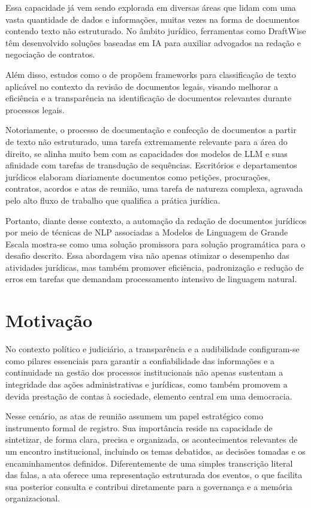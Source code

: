 Essa capacidade já vem sendo explorada em diversas áreas que lidam com uma vasta quantidade de dados e informações, muitas vezes na forma de documentos contendo texto não estruturado. No âmbito jurídico, ferramentas como DraftWise têm desenvolvido soluções baseadas em IA para auxiliar advogados na redação e negociação de contratos.

Além disso, estudos como o de  propõem frameworks para classificação de texto aplicável no contexto da revisão de documentos legais, visando melhorar a eficiência e a transparência na identificação de documentos relevantes durante processos legais.   

Notoriamente, o processo de documentação e confecção de documentos a partir de texto não estruturado, uma tarefa extremamente relevante para a área do direito, se alinha muito bem com as capacidades dos modelos de LLM e suas afinidade com tarefas de transdução de sequências. Escritórios e departamentos jurídicos elaboram diariamente documentos como petições, procurações, contratos, acordos e atas de reunião, uma tarefa de natureza complexa, agravada pelo alto fluxo de trabalho que qualifica a prática jurídica.

Portanto, diante desse contexto, a automação da redação de documentos jurídicos por meio de técnicas de NLP associadas a Modelos de Linguagem de Grande Escala mostra-se como uma solução promissora para solução programática para o desafio descrito. Essa abordagem visa não apenas otimizar o desempenho das atividades jurídicas, mas também promover eficiência, padronização e redução de erros em tarefas que demandam processamento intensivo de linguagem natural.  

\section{Motivação}
\label{sec:motivacao}

No contexto político e judiciário, a transparência e a audibilidade configuram-se como pilares essenciais para garantir a confiabilidade das informações e a continuidade na gestão dos processos institucionais \cite{fernandes_propaganda_2021} não apenas sustentam a integridade das ações administrativas e jurídicas, como também promovem a devida prestação de contas à sociedade, elemento central em uma democracia.

Nesse cenário, as atas de reunião assumem um papel estratégico como instrumento formal de registro. Sua importância reside na capacidade de sintetizar, de forma clara, precisa e organizada, os acontecimentos relevantes de um encontro institucional, incluindo os temas debatidos, as decisões tomadas e os encaminhamentos definidos. Diferentemente de uma simples transcrição literal das falas, a ata oferece uma representação estruturada dos eventos, o que facilita sua posterior consulta e contribui diretamente para a governança e a memória organizacional.

